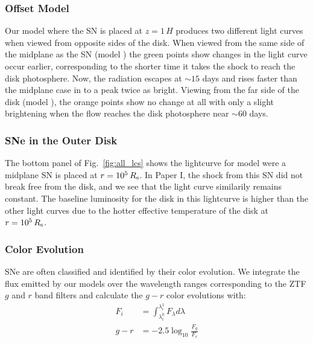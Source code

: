 \subsubsection{Offset Model}

Our model where the SN is placed at $z=1\,H$ produces two different light curves when viewed from opposite sides of the disk.
When viewed from the same side of the midplane as the SN (model ) the green points show changes in the light curve occur earlier, corresponding to the shorter time it takes the shock to reach the disk photosphere.
Now, the radiation escapes at $\sim15$ days and rises faster than the midplane case in  to a peak twice as bright.
Viewing from the far side of the disk (model ), the orange points show no change at all with only a slight brightening when the flow reaches the disk photosphere near $\sim60$ days.

\subsubsection{SNe in the Outer Disk}

The bottom panel of Fig.~\ref{fig:all_lcs} shows the lightcurve for model  were a midplane SN is placed at $r=10^5\,R_{\rm s}$.
In Paper I, the shock from this SN did not break free from the disk, and we see that the light curve similarily remains constant.
The baseline luminosity for the disk in this lightcurve is higher than the other light curves due to the hotter effective temperature of the disk at $r=10^5\,R_{\rm s}$. 



\subsubsection{Color Evolution}
SNe are often classified and identified by their color evolution.
We integrate the flux emitted by our models over the wavelength ranges corresponding to the ZTF $g$ and $r$ band filters and calculate the $g-r$ color evolutions with:
\begin{align}
	F_{i} &= \int_{\lambda_{i}^0} ^{\lambda_{i}^1} F_\lambda d\lambda \\
	g-r     &= -2.5\log_{10}\frac{F_g}{F_r}
\end{align}

